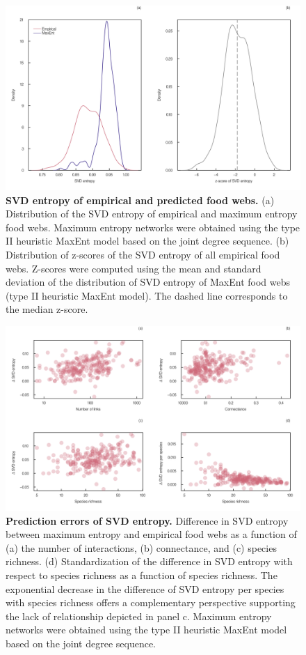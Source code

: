 \begin{figure}[h]
    \centering
    \includegraphics[width=\textwidth]{figures/S_article2/entropy_distribution.png}
    \caption{\textbf{SVD entropy of empirical and predicted food webs.} (a) Distribution of the
    SVD entropy of empirical and maximum entropy food webs. Maximum entropy networks
    were obtained using the type II heuristic MaxEnt model based on the joint degree
    sequence. (b) Distribution of z-scores of the SVD entropy of all empirical food
    webs. Z-scores were computed using the mean and standard deviation of the
    distribution of SVD entropy of MaxEnt food webs (type II heuristic MaxEnt
    model). The dashed line corresponds to the median
    z-score.}
    \label{fig:entropy_dist}
\end{figure}

\begin{figure}[h]
    \centering
    \includegraphics[width=\textwidth]{figures/S_article2/difference_entropy.png}
    \caption{\textbf{Prediction errors of SVD entropy.} Difference in SVD entropy between
    maximum entropy and empirical food webs as a function of (a) the number of
    interactions, (b) connectance, and (c) species richness. (d) Standardization of
    the difference in SVD entropy with respect to species richness as a function of
    species richness. The exponential decrease in the difference of SVD entropy per
    species with species richness offers a complementary perspective supporting the
    lack of relationship depicted in panel c. Maximum entropy networks were obtained
    using the type II heuristic MaxEnt model based on the joint degree
    sequence.}
    \label{fig:entropy_size}
\end{figure}

